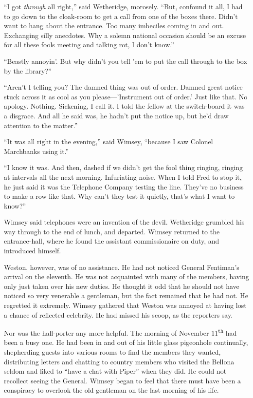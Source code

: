 \enquote{I got \textit{through} all right,} said Wetheridge, morosely. \enquote{But, confound it all, I had to go down to the cloak-room to get a call from one of the boxes there. Didn't want to hang about the entrance. Too many imbeciles coming in and out. Exchanging silly anecdotes. Why a solemn national occasion should be an excuse for all these fools meeting and talking rot, I don't know.}

\enquote{Beastly annoyin'. But why didn't you tell 'em to put the call through to the box by the library?}

\enquote{Aren't I telling you? The damned thing was out of order. Damned great notice stuck across it as cool as you please---'Instrument out of order.' Just like that. No apology. Nothing. Sickening, I call it. I told the fellow at the switch-board it was a disgrace. And all he said was, he hadn't put the notice up, but he'd draw attention to the matter.}

\enquote{It was all right in the evening,} said Wimsey, \enquote{because I saw Colonel Marchbanks using it.}

\enquote{I know it was. And then, dashed if we didn't get the fool thing ringing, ringing at intervals all the next morning. Infuriating noise. When I told Fred to stop it, he just said it was the Telephone Company testing the line. They've no business to make a row like that. Why can't they test it quietly, that's what I want to know?}

Wimsey said telephones were an invention of the devil. Wetheridge grumbled his way through to the end of lunch, and departed. Wimsey returned to the entrance-hall, where he found the assistant commissionaire on duty, and introduced himself.

Weston, however, was of no assistance. He had not noticed General Fentiman's arrival on the eleventh. He was not acquainted with many of the members, having only just taken over his new duties. He thought it odd that he should not have noticed so very venerable a gentleman, but the fact remained that he had not. He regretted it extremely. Wimsey gathered that Weston was annoyed at having lost a chance of reflected celebrity. He had missed his scoop, as the reporters say.

Nor was the hall-porter any more helpful. The morning of November  11\textsuperscript{th} had been a busy one. He had been in and out of his little glass pigeonhole continually, shepherding guests into various rooms to find the members they wanted, distributing letters and chatting to country members who visited the Bellona seldom and liked to \enquote{have a chat with Piper} when they did. He could not recollect seeing the General. Wimsey began to feel that there must have been a conspiracy to overlook the old gentleman on the last morning of his life.

